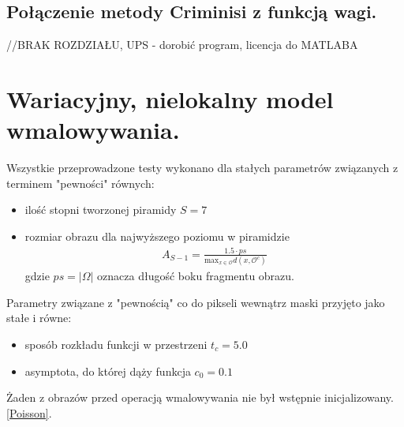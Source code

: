 \documentclass[12pt, twoside, openany]{report}
\theoremstyle{definition}
\begin{document}
\subsection{Połączenie metody Criminisi z funkcją wagi.}
//BRAK ROZDZIAŁU, UPS - dorobić program, licencja do MATLABA

\section{Wariacyjny, nielokalny model wmalowywania.}
Wszystkie przeprowadzone testy wykonano dla stałych parametrów związanych z terminem "pewności" równych:
\begin{itemize}
\item
ilość stopni tworzonej piramidy $S=7$
\item
rozmiar obrazu dla najwyższego poziomu w piramidzie 
\begin{align}
A_{S-1}=\frac{1.5 \cdot ps}{\mathrm{max}_{x \in \mathcal{O}}d(x,\mathcal{O}^{c})}
\end{align}
gdzie $ps = |\Omega|$ oznacza długość boku fragmentu obrazu.
\end{itemize}
Parametry związane z "pewnością" co do pikseli wewnątrz maski przyjęto jako stałe i równe:
\begin{itemize}
\item
sposób rozkładu funkcji w przestrzeni $t_{c}=5.0$
\item 
asymptota, do której dąży funkcja $c_{0}=0.1$
\end{itemize}
Żaden z obrazów przed operacją wmalowywania nie był wstępnie inicjalizowany. \eqref{Poisson}.
\end{document}
